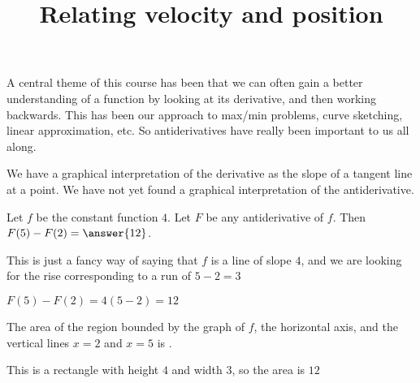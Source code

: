 \documentclass{ximera}
\title[Dig-In:]{Relating velocity and position}
\begin{document}
A central theme of this course has been that we can often gain a
better understanding of a function by looking at its derivative, and
then working backwards.  This has been our approach to max/min
problems, curve sketching, linear approximation, etc.  So
antiderivatives have really been important to us all along.

We have a graphical interpretation of the derivative as the slope of a
tangent line at a point.  We have not yet found a graphical
interpretation of the antiderivative.

  \begin{question}
   Let $f$ be the constant function $4$. Let $F$ be any antiderivative
   of $f$.  Then $F(5)-F(2) = \answer{12}$.
   \begin{hint}
    This is just a fancy way of saying that $f$ is a line of slope
    $4$, and we are looking for the rise corresponding to a run of
    $5-2= 3$
   \end{hint}
   \begin{hint}
    $F(5) - F(2) = 4(5-2) = 12$
   \end{hint}
  \end{question}
  
  \begin{question}
    The area of the region bounded by the graph of $f$, the horizontal
    axis, and the vertical lines $x=2$ and $x=5$ is .
    
    \begin{hint}
      \begin{image}
\end{image}
    \end{hint}
    \begin{hint}
      This is a rectangle with height $4$ and width $3$, so the area is $12$
    \end{hint}
  \end{question}
\end{document}
